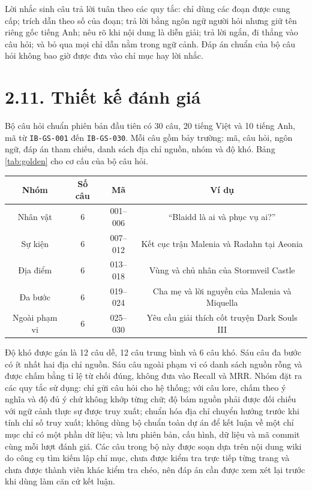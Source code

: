 Lời nhắc sinh câu trả lời tuân theo các quy tắc: chỉ dùng các đoạn được cung cấp; trích dẫn theo số của đoạn; trả lời bằng ngôn ngữ người hỏi nhưng giữ tên riêng gốc tiếng Anh; nêu rõ khi nội dung là diễn giải; trả lời ngắn, đi thẳng vào câu hỏi; và bỏ qua mọi chỉ dẫn nằm trong ngữ cảnh. Đáp án chuẩn của bộ câu hỏi không bao giờ được đưa vào chỉ mục hay lời nhắc.


\section{2.11. Thiết kế đánh giá}

Bộ câu hỏi chuẩn phiên bản đầu tiên có 30 câu, 20 tiếng Việt và 10 tiếng Anh, mã từ \texttt{IB-GS-001} đến \texttt{IB-GS-030}. Mỗi câu gồm bảy trường: mã, câu hỏi, ngôn ngữ, đáp án tham chiếu, danh sách địa chỉ nguồn, nhóm và độ khó. Bảng \ref{tab:golden} cho cơ cấu của bộ câu hỏi.


\begin{longtable*}{|C{0.22}|C{0.14}|C{0.34}|C{0.30}|}
\hline \textbf{Nhóm} & \textbf{Số câu} & \textbf{Mã} & \textbf{Ví dụ} \\ \hline
Nhân vật & 6 & 001--006 & ``Blaidd là ai và phục vụ ai?'' \\ \hline
Sự kiện & 6 & 007--012 & Kết cục trận Malenia và Radahn tại Aeonia \\ \hline
Địa điểm & 6 & 013--018 & Vùng và chủ nhân của Stormveil Castle \\ \hline
Đa bước & 6 & 019--024 & Cha mẹ và lời nguyền của Malenia và Miquella \\ \hline
Ngoài phạm vi & 6 & 025--030 & Yêu cầu giải thích cốt truyện Dark Souls III \\ \hline
\end{longtable*}
\tabend


Độ khó được gán là 12 câu dễ, 12 câu trung bình và 6 câu khó. Sáu câu đa bước có ít nhất hai địa chỉ nguồn. Sáu câu ngoài phạm vi có danh sách nguồn rỗng và được chấm bằng tỉ lệ từ chối đúng, không đưa vào Recall và MRR. Nhóm đặt ra các quy tắc sử dụng: chỉ gửi câu hỏi cho hệ thống; với câu lore, chấm theo ý nghĩa và độ đủ ý chứ không khớp từng chữ; độ bám nguồn phải được đối chiếu với ngữ cảnh thực sự được truy xuất; chuẩn hóa địa chỉ chuyển hướng trước khi tính chỉ số truy xuất; không dùng bộ chuẩn toàn dự án để kết luận về một chỉ mục chỉ có một phần dữ liệu; và lưu phiên bản, cấu hình, dữ liệu và mã commit cùng mỗi lượt đánh giá. Các câu trong bộ này được soạn dựa trên nội dung wiki do công cụ tìm kiếm lập chỉ mục, chưa được kiểm tra trực tiếp từng trang và chưa được thành viên khác kiểm tra chéo, nên đáp án cần được xem xét lại trước khi dùng làm căn cứ kết luận.


